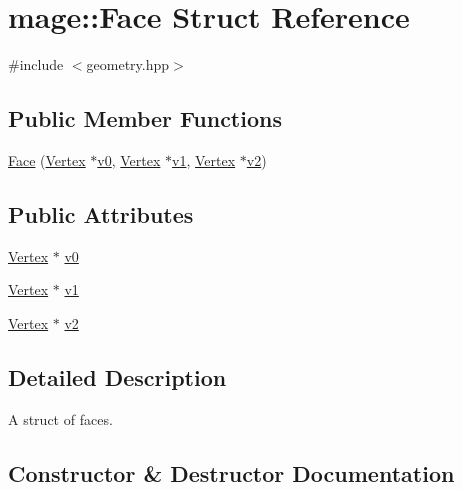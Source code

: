 \hypertarget{structmage_1_1_face}{}\section{mage\+:\+:Face Struct Reference}
\label{structmage_1_1_face}


{\ttfamily \#include $<$geometry.\+hpp$>$}

\subsection*{Public Member Functions}
\begin{DoxyCompactItemize}
\item 
\hyperlink{structmage_1_1_face_a67d33d5e7741cc21d397161f79af19bb}{Face} (\hyperlink{structmage_1_1_vertex}{Vertex} $\ast$\hyperlink{structmage_1_1_face_a8a99c634b7b8dbb37ff3eb70308506dd}{v0}, \hyperlink{structmage_1_1_vertex}{Vertex} $\ast$\hyperlink{structmage_1_1_face_a811aaac2c5e02052763ebdaef4121da0}{v1}, \hyperlink{structmage_1_1_vertex}{Vertex} $\ast$\hyperlink{structmage_1_1_face_a5ad0b031cb4445cef137e1e8b2fa79c8}{v2})
\end{DoxyCompactItemize}
\subsection*{Public Attributes}
\begin{DoxyCompactItemize}
\item 
\hyperlink{structmage_1_1_vertex}{Vertex} $\ast$ \hyperlink{structmage_1_1_face_a8a99c634b7b8dbb37ff3eb70308506dd}{v0}
\item 
\hyperlink{structmage_1_1_vertex}{Vertex} $\ast$ \hyperlink{structmage_1_1_face_a811aaac2c5e02052763ebdaef4121da0}{v1}
\item 
\hyperlink{structmage_1_1_vertex}{Vertex} $\ast$ \hyperlink{structmage_1_1_face_a5ad0b031cb4445cef137e1e8b2fa79c8}{v2}
\end{DoxyCompactItemize}


\subsection{Detailed Description}
A struct of faces. 

\subsection{Constructor \& Destructor Documentation}
\hypertarget{structmage_1_1_face_a67d33d5e7741cc21d397161f79af19bb}{}\label{structmage_1_1_face_a67d33d5e7741cc21d397161f79af19bb} 

